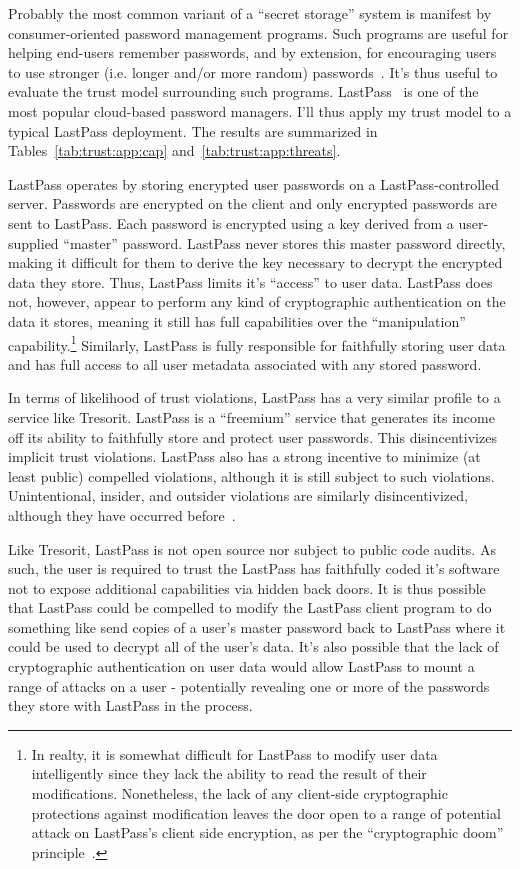 Probably the most common variant of a ``secret storage'' system is
manifest by consumer-oriented password management programs. Such
programs are useful for helping end-users remember passwords, and by
extension, for encouraging users to use stronger (i.e. longer and/or
more random) passwords~\cite{brodkin-passman, krebs-passwords,
  schneier-passwords}. It's thus useful to evaluate the trust model
surrounding such programs. LastPass~\cite{lastpass} is one of the most
popular cloud-based password managers. I'll thus apply my trust model
to a typical LastPass deployment. The results are summarized in
Tables~\ref{tab:trust:app:cap} and~\ref{tab:trust:app:threats}.

LastPass operates by storing encrypted user passwords on a
LastPass-controlled server. Passwords are encrypted on the client and
only encrypted passwords are sent to LastPass. Each password is
encrypted using a key derived from a user-supplied ``master''
password. LastPass never stores this master password directly, making
it difficult for them to derive the key necessary to decrypt the
encrypted data they store. Thus, LastPass limits it's ``access'' to
user data. LastPass does not, however, appear to perform any kind of
cryptographic authentication on the data it stores, meaning it still
has full capabilities over the ``manipulation''
capability.\footnote{In realty, it is somewhat difficult for LastPass
  to modify user data intelligently since they lack the ability to
  read the result of their modifications. Nonetheless, the lack of any
  client-side cryptographic protections against modification leaves
  the door open to a range of potential attack on LastPass's client
  side encryption, as per the ``cryptographic doom''
  principle~\cite{marlinspike-doom}.}  Similarly, LastPass is fully
responsible for faithfully storing user data and has full access to
all user metadata associated with any stored password.

In terms of likelihood of trust violations, LastPass has a very
similar profile to a service like Tresorit. LastPass is a ``freemium''
service that generates its income off its ability to faithfully store
and protect user passwords. This disincentivizes implicit trust
violations. LastPass also has a strong incentive to minimize (at least
public) compelled violations, although it is still subject to such
violations. Unintentional, insider, and outsider violations are
similarly disincentivized, although they have occurred
before~\cite{lastpass-blog-breach}.

Like Tresorit, LastPass is not open source nor subject to public code
audits. As such, the user is required to trust the LastPass has
faithfully coded it's software not to expose additional capabilities
via hidden back doors. It is thus possible that LastPass could be
compelled to modify the LastPass client program to do something like
send copies of a user's master password back to LastPass where it
could be used to decrypt all of the user's data. It's also possible that
the lack of cryptographic authentication on user data would allow
LastPass to mount a range of attacks on a user - potentially revealing
one or more of the passwords they store with LastPass in the process.

